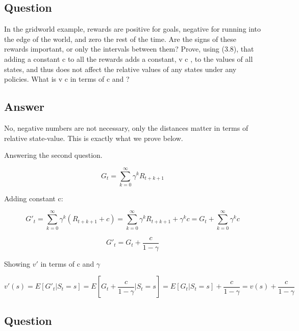 \documentclass[11pt]{article}
\begin{document}
    \subsection{Question}

    In the gridworld example, rewards are positive for goals, negative for running into the edge of the world, and zero the rest of the time.
    Are the signs of these rewards important, or only the intervals between them?
    Prove, using (3.8), that adding a constant c to all the rewards adds a constant, v c , to the values of all states, and thus does not affect the relative values of any states under any policies.
    What is v c in terms of c and ?

    \subsection*{Answer}

    No, negative numbers are not necessary, only the distances matter in terms of relative state-value. This is exactly what we prove below.

    Answering the second question.

    \begin{equation}
        G_{t} = \sum_{k=0}^{\infty} \gamma^{k} R_{t+k+1}
    \end{equation}

    Adding constant c:

    \begin{equation}
        G'_{t} = \sum_{k=0}^{\infty} \gamma^{k} (R_{t+k+1} + c) = \sum_{k=0}^{\infty} \gamma^{k} R_{t+k+1} + \gamma^{k} c = G_{t} +  \sum_{k=0}^{\infty} \gamma^{k} c
    \end{equation}

    \begin{equation}
        G'_{t} =  G_{t} + \frac{c}{1-\gamma}
    \end{equation}

    Showing $v'$ in terms of c and $\gamma$

    \begin{equation}
        v'(s) =  E[G'_{t}|S_{t}=s] = E[G_{t} + \frac{c}{1-\gamma}|S_{t}=s] = E[G_{t}|S_{t}=s] + \frac{c}{1-\gamma} = v(s) + \frac{c}{1-\gamma}
    \end{equation}

    \subsection{Question}
\end{document}
